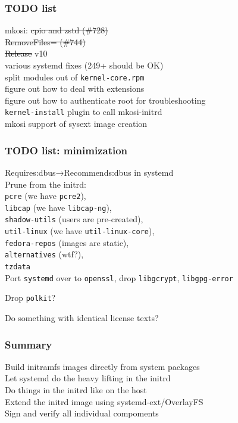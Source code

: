 \documentclass[]{beamer}
\begin{document}
\begin{frame}
  \frametitle{TODO list}

  mkosi: \sout{cpio and zstd (\#728)}\\
  \phantom{mkosi: }\sout{RemoveFiles= (\#744)}\\
  \phantom{mkosi: }\sout{Release} v10\\

  various systemd fixes (249+ should be OK)\\

  split modules out of \texttt{kernel-core.rpm}\\

  figure out how to deal with extensions\\
  figure out how to authenticate root for troubleshooting\\

  \texttt{kernel-install} plugin to call mkosi-initrd\\

  mkosi support of sysext image creation
\end{frame}

\begin{frame}
  \frametitle{TODO list: minimization}

  Requires:dbus→Recommends:dbus in systemd\\

  Prune from the initrd:\\
  \texttt{pcre} (we have \texttt{pcre2}),\\
  \texttt{libcap} (we have \texttt{libcap-ng}),\\
  \texttt{shadow-utils} (users are pre-created),\\
  \texttt{util-linux} (we have \texttt{util-linux-core}),\\
  \texttt{fedora-repos} (images are static),\\
  \texttt{alternatives} (wtf?),\\
  \texttt{tzdata}\\

  Port \texttt{systemd} over to \texttt{openssl}, drop \texttt{libgcrypt}, \texttt{libgpg-error}

  Drop \texttt{polkit}?

  Do something with identical license texts?
\end{frame}

\begin{frame}
  \frametitle{Summary}

  Build initramfs images directly from system packages\\
  Let systemd do the heavy lifting in the initrd\\
  Do things in the initrd like on the host\\
  Extend the initrd image using systemd-ext/OverlayFS\\
  Sign and verify all individual compoments

\end{frame}
\end{document}

